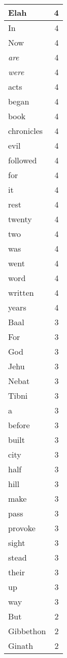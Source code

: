 \begin{center}
\begin{longtable}{l|r}
Elah & 4 \\ \hline
In & 4 \\ \hline
Now & 4 \\ \hline
\emph{are} & 4 \\ \hline
\emph{were} & 4 \\ \hline
acts & 4 \\ \hline
began & 4 \\ \hline
book & 4 \\ \hline
chronicles & 4 \\ \hline
evil & 4 \\ \hline
followed & 4 \\ \hline
for & 4 \\ \hline
it & 4 \\ \hline
rest & 4 \\ \hline
twenty & 4 \\ \hline
two & 4 \\ \hline
was & 4 \\ \hline
went & 4 \\ \hline
word & 4 \\ \hline
written & 4 \\ \hline
years & 4 \\ \hline
Baal & 3 \\ \hline
For & 3 \\ \hline
God & 3 \\ \hline
Jehu & 3 \\ \hline
Nebat & 3 \\ \hline
Tibni & 3 \\ \hline
a & 3 \\ \hline
before & 3 \\ \hline
built & 3 \\ \hline
city & 3 \\ \hline
half & 3 \\ \hline
hill & 3 \\ \hline
make & 3 \\ \hline
pass & 3 \\ \hline
provoke & 3 \\ \hline
sight & 3 \\ \hline
stead & 3 \\ \hline
their & 3 \\ \hline
up & 3 \\ \hline
way & 3 \\ \hline
But & 2 \\ \hline
Gibbethon & 2 \\ \hline
Ginath & 2 \\ \hline

\end{longtable}
\end{center}
